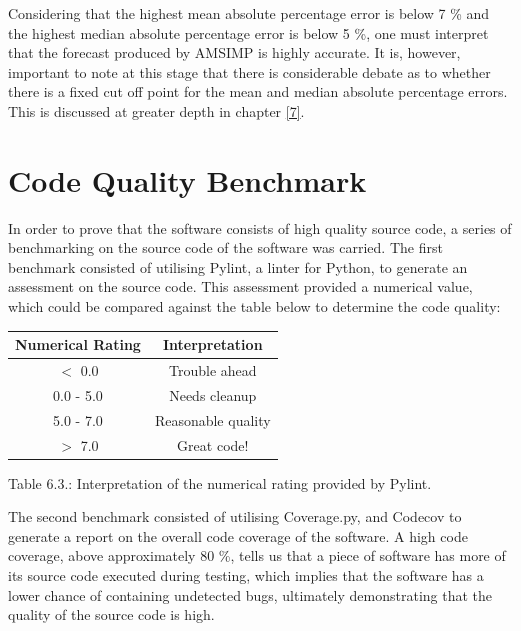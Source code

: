 Considering that the highest mean absolute percentage error is below 7 \% and the highest median absolute percentage error is below 5 \%, one must interpret that the forecast produced by AMSIMP is highly accurate. It is, however, important to note at this stage that there is considerable debate as to whether there is a fixed cut off point for the mean and median absolute percentage errors. This is discussed at greater depth in chapter \ref{7}.

\section{Code Quality Benchmark}\label{PCQ}
In order to prove that the software consists of high quality source code, a series of benchmarking on the source code of the software was carried. The first benchmark consisted of utilising Pylint, a linter for Python, to generate an assessment on the source code. This assessment provided a numerical value, which could be compared against the table below to determine the code quality\cite{pylint}:

\hfill

\begin{center}
    \begin{tabular}{|c|c|} 
         \hline
         Numerical Rating & Interpretation \\
         \hline
         $<$ 0.0 & Trouble ahead \\
         \hline
         0.0 - 5.0 & Needs cleanup \\
         \hline
         5.0 - 7.0 & Reasonable quality \\
         \hline
         $>$ 7.0 & Great code! \\
         \hline
    \end{tabular}\par  
    \bigskip
    Table 6.3.: Interpretation of the numerical rating provided by Pylint.
\end{center}

The second benchmark consisted of utilising Coverage.py, and Codecov to generate a report on the overall code coverage of the software. A high code coverage, above approximately 80 \%, tells us that a piece of software has more of its source code executed during testing, which implies that the software has a lower chance of containing undetected bugs, ultimately demonstrating that the quality of the source code is high.

